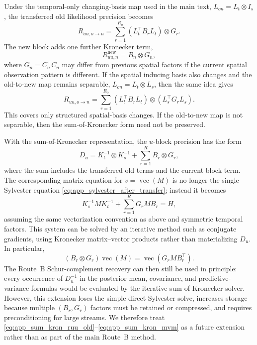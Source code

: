 \documentclass[12pt]{article}
\newcommand{\vecop}{\operatorname{vec}}
\begin{document}
Under the temporal-only changing-basis map used in the main text,
\(L_{on}=L_t\otimes I_s\), the transferred old likelihood precision becomes
\begin{equation}
    R_{uu,o\to n}
    =
    \sum_{r=1}^{R_o}
    \left(L_t^\top B_r L_t\right)\otimes G_r .
    \label{eq:app_sum_kron_transfer}
\end{equation}
The new block adds one further Kronecker term,
\begin{equation}
    R_{uu,n}^{\mathrm{new}}
    =
    B_n\otimes G_n,
    \label{eq:app_sum_kron_new_block}
\end{equation}
where \(G_n=C_n^\top C_n\) may differ from previous spatial factors if the
current spatial observation pattern is different.  If the spatial inducing
basis also changes and the old-to-new map remains separable,
\(L_{on}=L_t\otimes L_s\), then the same idea gives
\begin{equation}
    R_{uu,o\to n}
    =
    \sum_{r=1}^{R_o}
    \left(L_t^\top B_r L_t\right)
    \otimes
    \left(L_s^\top G_r L_s\right).
    \label{eq:app_sum_kron_spatial_transfer}
\end{equation}
This covers only structured spatial-basis changes.  If the old-to-new map is
not separable, then the sum-of-Kronecker form need not be preserved.

With the sum-of-Kronecker representation, the $u$-block precision has the
form
\begin{equation}
    D_u
    =
    K_t^{-1}\otimes K_s^{-1}
    +
    \sum_{r=1}^{R} B_r\otimes G_r,
    \label{eq:app_sum_kron_du}
\end{equation}
where the sum includes the transferred old terms and the current block term.
The corresponding matrix equation for \(v=\vecop(M)\) is no longer the
single Sylvester equation \eqref{eq:app_sylvester_after_transfer}; instead it
becomes
\begin{equation}
    K_s^{-1}M K_t^{-1}
    +
    \sum_{r=1}^{R} G_r M B_r
    =
    H,
    \label{eq:app_sum_kron_matrix_equation}
\end{equation}
assuming the same vectorization convention as above and symmetric temporal
factors.  This system can be solved by an iterative method such as conjugate
gradients, using Kronecker matrix--vector products rather than materializing
\(D_u\).  In particular,
\begin{equation}
    \left(B_r\otimes G_r\right)\vecop(M)
    =
    \vecop\!\left(G_r M B_r^\top\right).
    \label{eq:app_sum_kron_mvm}
\end{equation}
The Route~B Schur-complement recovery can then still be used in principle:
every occurrence of \(D_u^{-1}\) in the posterior mean, covariance, and
predictive-variance formulas would be evaluated by the iterative
sum-of-Kronecker solver.  However, this extension loses the simple direct
Sylvester solve, increases storage because multiple \((B_r,G_r)\) factors
must be retained or compressed, and requires preconditioning for large
streams.  We therefore treat \eqref{eq:app_sum_kron_ruu_old}--\eqref{eq:app_sum_kron_mvm}
as a future extension rather than as part of the main Route~B method.
\end{document}
